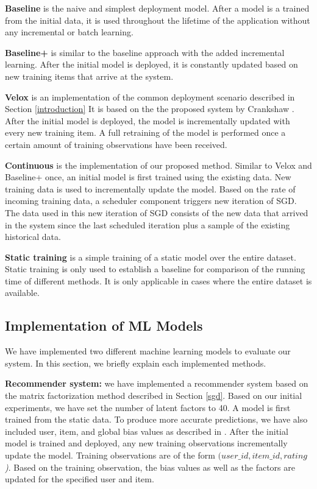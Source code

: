 \documentclass{vldb}
\begin{document}
\textbf{Baseline} is the naive and simplest deployment model. 
After a model is a trained from the initial data, it is used throughout the lifetime of the application without any incremental or batch learning.

\textbf{Baseline+} is similar to the baseline approach with the added incremental learning.
After the initial model is deployed, it is constantly updated based on new training items that arrive at the system.

\textbf{Velox} is an implementation of the common deployment scenario described in Section \ref{introduction}
It is based on the the proposed system by Crankshaw \cite{crankshaw2014missing}. 
After the initial model is deployed, the model is incrementally updated with every new training item.
A full retraining of the model is performed once a certain amount of training observations have been received.

\textbf{Continuous} is the implementation of our proposed method. 
Similar to Velox and Baseline+ once, an initial model is first trained using the existing data.
New training data is used to incrementally update the model.
Based on the rate of incoming training data, a scheduler component triggers new iteration of SGD.
The data used in this new iteration of SGD consists of the new data that arrived in the system since the last scheduled iteration plus a sample of the existing historical data.

\textbf{Static training} is a simple training of a static model over the entire dataset. 
Static training is only used to establish a baseline for comparison of the running time of different methods.
It is only applicable in cases where the entire dataset is available.

\subsection{Implementation of ML Models}
We have implemented two different machine learning models to evaluate our system.
In this section, we briefly explain each implemented methods.

\textbf{Recommender system:} we have implemented a recommender system based on the matrix factorization method described in Section \ref{sgd}.
Based on our initial experiments, we have set the number of latent factors to 40.
A model is first trained from the static data.
To produce more accurate predictions, we have also included user, item, and global bias values as described in \cite{koren2009matrix}.
After the initial model is trained and deployed, any new training observations incrementally update the model.
Training observations are of the form \textit{\((user\_id, item\_id, rating\))}.
Based on the training observation, the bias values as well as the factors are updated for the specified user and item.
\end{document}
